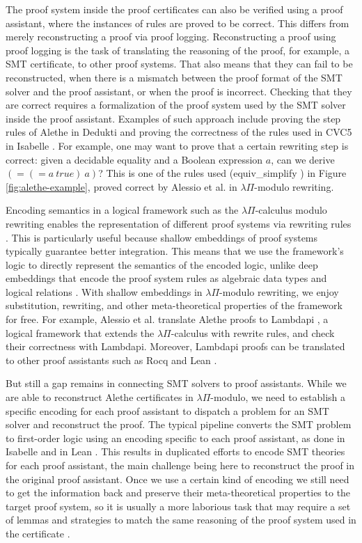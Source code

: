 \documentclass[11pt,twoside]{article}
\begin{document}
The proof system inside the proof certificates can also be verified using a proof assistant, where the instances of rules are proved to be correct.
This differs from merely reconstructing a proof via proof logging.
Reconstructing a proof using proof logging is the task of translating the reasoning of the proof, for example, a SMT certificate, to other proof systems. That also means that they can fail to be reconstructed, when there is a mismatch between the proof format of the SMT solver and the proof assistant, or when the proof is incorrect.
Checking that they are correct requires a formalization of the proof system used by the SMT solver inside the proof assistant.
Examples of such approach include proving the step rules of Alethe in Dedukti \cite{alessio} and proving the correctness of the rules used in CVC5 in Isabelle \cite{LFA24}.
For example, one may want to prove that a certain rewriting step is correct: given a decidable equality and a Boolean expression $a$, can we derive $(= (= a\:true)\:a)$?
This is one of the rules used (equiv\_simplify \cite{alethe2020}) in Figure \ref{fig:alethe-example}, proved correct by Alessio et al. \cite{alessio} in $\lambda\Pi$-modulo rewriting.

Encoding semantics in a logical framework such as the $\lambda\Pi$-calculus modulo rewriting enables the representation of different proof systems via rewriting rules \cite{alessio}.
This is particularly useful because shallow embeddings of proof systems typically guarantee better integration. This means that we use the framework's logic to directly represent the semantics of the encoded logic, unlike deep embeddings that encode the proof system rules as algebraic data types and logical relations \cite{benzmueller2025faithful}.
With shallow embeddings in $\lambda\Pi$-modulo rewriting, we enjoy substitution, rewriting, and other meta-theoretical properties of the framework for free. For example, Alessio et al. \cite{alessio} translate Alethe proofs to Lambdapi \cite{hondet20fscd}, a logical framework that extends the $\lambda\Pi$-calculus with rewrite rules, and check their correctness with Lambdapi.
Moreover, Lambdapi proofs can be translated to other proof assistants such as Rocq and Lean \cite{thire18lfmtp,LPAR2024:Translating_HOL_Light_proofs}.

But still a gap remains in connecting SMT solvers to proof assistants.
While we are able to reconstruct Alethe certificates in $\lambda\Pi$-modulo, we need to establish a specific encoding for each proof assistant to dispatch a problem for an SMT solver and reconstruct the proof.
The typical pipeline converts the SMT problem to first-order logic using an encoding specific to each proof assistant, as done in Isabelle \cite{sleddehammer} and in Lean \cite{leansmt}.
This results in duplicated efforts to encode SMT theories for each proof assistant, the main challenge being here to reconstruct the proof in the original proof assistant.
Once we use a certain kind of encoding we still need to get the information back and preserve their meta-theoretical properties to the target proof system, so it is usually a more laborious task that may require a set of lemmas and strategies to match the same reasoning of the proof system used in the certificate \cite{leansmt}.
\end{document}
